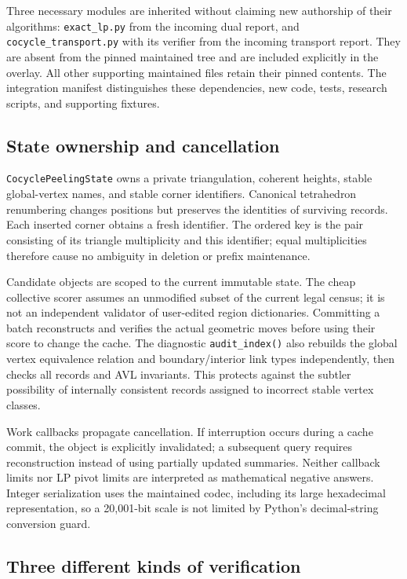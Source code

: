 Three necessary modules are inherited without claiming new authorship of
their algorithms: \texttt{exact\_lp.py} from the incoming dual report, and
\texttt{cocycle\_transport.py} with its verifier from the incoming transport
report. They are absent from the pinned maintained tree and are included
explicitly in the overlay. All other supporting maintained files retain
their pinned contents. The integration manifest distinguishes these
dependencies, new code, tests, research scripts, and supporting fixtures.

\subsection{State ownership and cancellation}

\texttt{CocyclePeelingState} owns a private triangulation, coherent heights,
stable global-vertex names, and stable corner identifiers. Canonical
tetrahedron renumbering changes positions but preserves the identities of
surviving records. Each inserted corner obtains a fresh identifier. The
ordered key is the pair consisting of its triangle multiplicity and this
identifier; equal multiplicities therefore cause no ambiguity in deletion
or prefix maintenance.

Candidate objects are scoped to the current immutable state. The cheap
collective scorer assumes an unmodified subset of the current legal census;
it is not an independent validator of user-edited region dictionaries.
Committing a batch reconstructs and verifies the actual geometric moves
before using their score to change the cache. The diagnostic
\texttt{audit\_index()} also rebuilds the global vertex equivalence relation
and boundary/interior link types independently, then checks all records and
AVL invariants. This protects against the subtler possibility of internally
consistent records assigned to incorrect stable vertex classes.

Work callbacks propagate cancellation. If interruption occurs during a
cache commit, the object is explicitly invalidated; a subsequent query
requires reconstruction instead of using partially updated summaries.
Neither callback limits nor LP pivot limits are interpreted as mathematical
negative answers. Integer serialization uses the maintained codec, including
its large hexadecimal representation, so a 20,001-bit scale is not limited
by Python's decimal-string conversion guard.

\subsection{Three different kinds of verification}

